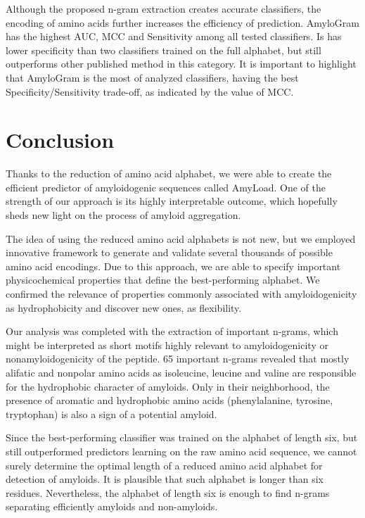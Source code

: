 \documentclass[a4,center,fleqn]{NAR}
\begin{document}
  Although the proposed n-gram extraction creates accurate classifiers, the 
encoding of amino acids further increases the efficiency of prediction. 
AmyloGram has the highest AUC, MCC and Sensitivity among all tested classifiers. 
Is has lower specificity than two classifiers trained on the full alphabet, but 
still outperforms other published method in this category. It is important to 
highlight that AmyloGram is the most  of analyzed classifiers, having 
the best Specificity/Sensitivity trade-off, as indicated by the value of MCC.

\section{Conclusion}

Thanks to the reduction of amino acid alphabet, we were able to create the 
efficient predictor of amyloidogenic sequences called AmyLoad. One of the 
strength of our approach is its highly interpretable outcome, which hopefully 
sheds new light on the process of amyloid aggregation.

  The idea of using the reduced amino acid alphabets is not new, but we employed 
innovative framework to generate and validate several thousands of possible 
amino acid encodings. Due to this approach, we are able to specify important 
physicochemical properties that define the best-performing alphabet.  We 
confirmed the relevance of properties commonly associated with amyloidogenicity 
as hydrophobicity and discover new ones, as flexibility.  

  Our analysis was completed with the extraction of important n-grams, which 
might be interpreted as short motifs highly relevant to amyloidogenicity or 
nonamyloidogenicity of the peptide. 65 important n-grams revealed that mostly 
alifatic and nonpolar amino acids as isoleucine, leucine and valine are 
responsible for the hydrophobic character of amyloids. Only in their 
%
%
%
neighborhood, the presence of aromatic and hydrophobic amino acids 
(phenylalanine, tyrosine, tryptophan) is also a sign of a potential amyloid. 

  Since the best-performing classifier was trained on the alphabet of length 
six, but still outperformed predictors learning on the raw amino acid sequence, 
we cannot surely determine the optimal length of a reduced amino acid alphabet 
for detection of amyloids. It is plausible that such alphabet is longer than 
six residues. Nevertheless, the alphabet of length six is enough to find 
n-grams separating efficiently amyloids and non-amyloids. 
\end{document}
